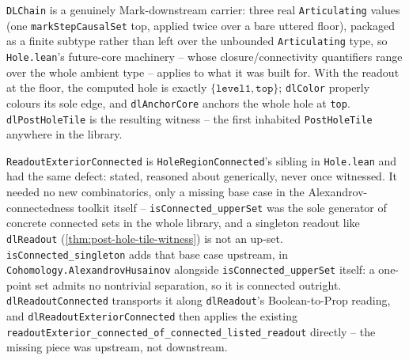 \begin{theorem}\label{thm:post-hole-tile-witness}\leanok{}
\texttt{DLChain} is a genuinely Mark-downstream carrier: three real \texttt{Articulating} values
(one \texttt{markStepCausalSet} top, applied twice over a bare uttered floor), packaged as a
finite subtype rather than left over the unbounded \texttt{Articulating} type, so
\texttt{Hole.lean}'s future-core machinery -- whose closure/connectivity quantifiers range over
the whole ambient type -- applies to what it was built for. With the readout at the floor, the
computed hole is exactly $\{\texttt{level1}, \texttt{top}\}$; \texttt{dlColor} properly colours
its sole edge, and \texttt{dlAnchorCore} anchors the whole hole at \texttt{top}. \texttt{dlPostHoleTile}
is the resulting witness -- the first inhabited \texttt{PostHoleTile} anywhere in the library.
\end{theorem}

\begin{theorem}\label{thm:readout-exterior-connected-witness}\leanok{}
\texttt{ReadoutExteriorConnected} is \texttt{HoleRegionConnected}'s sibling in \texttt{Hole.lean}
and had the same defect: stated, reasoned about generically, never once witnessed. It needed no new
combinatorics, only a missing base case in the Alexandrov-connectedness toolkit itself --
\texttt{isConnected\_upperSet} was the sole generator of concrete connected sets in the whole
library, and a singleton readout like \texttt{dlReadout} (\cref{thm:post-hole-tile-witness}) is not
an up-set. \texttt{isConnected\_singleton} adds that base case upstream, in
\texttt{Cohomology.AlexandrovHusainov} alongside \texttt{isConnected\_upperSet} itself: a one-point
set admits no nontrivial separation, so it is connected outright. \texttt{dlReadoutConnected}
transports it along \texttt{dlReadout}'s Boolean-to-Prop reading, and
\texttt{dlReadoutExteriorConnected} then applies the existing
\texttt{readoutExterior\_connected\_of\_connected\_listed\_readout} directly -- the missing piece
was upstream, not downstream.
\end{theorem}


